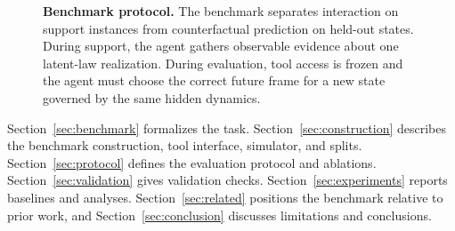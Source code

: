 \begin{figure}[t]
  \centering
  \caption{\textbf{Benchmark protocol.} The benchmark separates interaction on support instances from counterfactual prediction on held-out states. During support, the agent gathers observable evidence about one latent-law realization. During evaluation, tool access is frozen and the agent must choose the correct future frame for a new state governed by the same hidden dynamics.}
  \label{fig:hero}
\end{figure}

Section~\ref{sec:benchmark} formalizes the task. Section~\ref{sec:construction} describes the benchmark construction, tool interface, simulator, and splits. Section~\ref{sec:protocol} defines the evaluation protocol and ablations. Section~\ref{sec:validation} gives validation checks. Section~\ref{sec:experiments} reports baselines and analyses. Section~\ref{sec:related} positions the benchmark relative to prior work, and Section~\ref{sec:conclusion} discusses limitations and conclusions.
